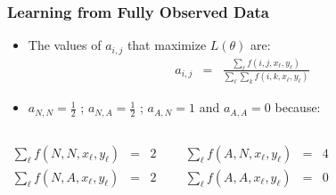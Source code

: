 \begin{frame}
\frametitle{Learning from Fully Observed Data}
\begin{itemize}[<+->]
\item The values of $a_{i,j}$ that maximize $L(\theta)$ are:
\begin{eqnarray*}
a_{i,j} & = & \frac{\sum_\ell f(i,j,x_\ell,y_\ell)}{\sum_\ell \sum_k f(i,k,x_\ell,y_\ell)} 
\end{eqnarray*}
\item $a_{N,N} = \frac{1}{2}$ ; $a_{N,A} = \frac{1}{2}$ ; $a_{A,N} = 1$ and $a_{A,A} = 0$ because:
\end{itemize}

\begin{columns}[c]
\column{2in}
\begin{eqnarray*}
\sum_\ell f(N, N, x_\ell, y_\ell) & = & 2 \\
\sum_\ell f(N, A, x_\ell, y_\ell) & = & 2 
\end{eqnarray*}

\column{1.5in}
\begin{eqnarray*}
\sum_\ell f(A, N, x_\ell, y_\ell) & = & 4 \\ 
\sum_\ell f(A, A, x_\ell, y_\ell) & = & 0 
\end{eqnarray*}
\end{columns}
\end{frame}


